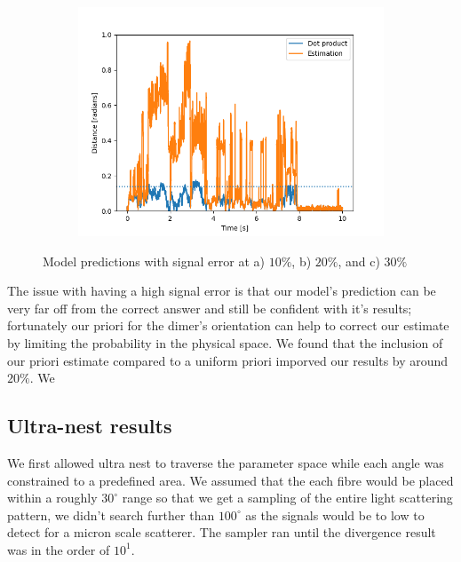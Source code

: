 \documentclass[11pt]{article}
\begin{document}
\begin{figure}[b]
\begin{subfigure}{0.33\textwidth}
		\end{subfigure}
		\begin{subfigure}{0.33\textwidth}
			\includegraphics[width=\textwidth]{Error_30_percent.png}
		\end{subfigure}
		\caption{Model predictions with signal error at a) $10 \%$, b)  $20\%$, and c) $30\%$}
	\end{figure}
	
	The issue with having a high signal error is that our model's prediction can be very far off from the correct answer and still be confident with it's results; fortunately our priori for the dimer's orientation can help to correct our estimate by limiting the probability in the physical space. We found that the inclusion of our priori estimate compared to a uniform priori imporved our results by around $20 \%$. We 
	\subsection*{Ultra-nest results}
	We first allowed ultra nest to traverse the parameter space while each angle was constrained to a predefined area. We assumed that the each fibre would be placed within a roughly $30^{\circ}$ range so that we get a sampling of the entire light scattering pattern, we didn't search further than $100^{\circ}$ as the signals would be to low to detect for a micron scale scatterer. The sampler ran until the divergence result was in the order of $10^1$.
	
\end{document}
